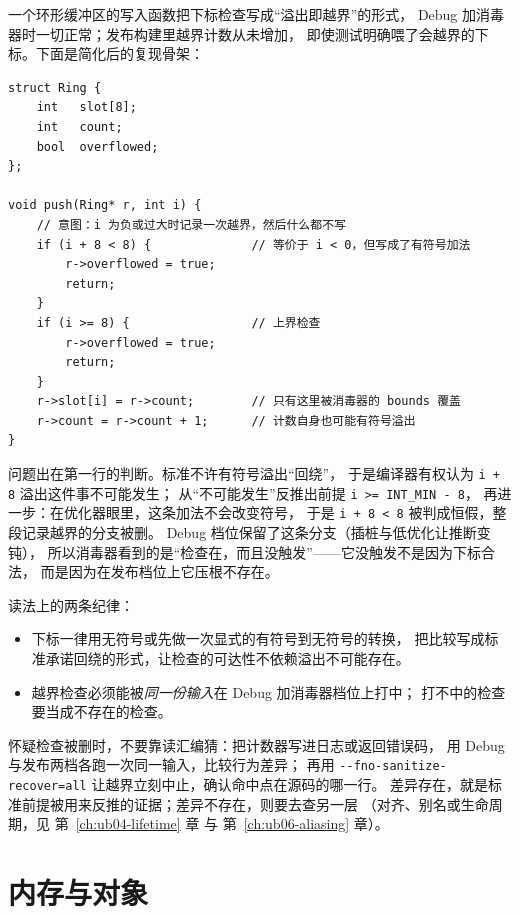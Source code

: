 \documentclass[12pt,a4paper,fontset=fandol]{ctexbook}
\newcommand{\Tp}[1]{\texttt{#1}}
\newcommand{\Opt}[1]{\texttt{-\/-#1}}
\begin{document}
\begin{casebox}[title={检查写在那儿，却一次也没触发}]
一个环形缓冲区的写入函数把下标检查写成“溢出即越界”的形式，
Debug 加消毒器时一切正常；发布构建里越界计数从未增加，
即使测试明确喂了会越界的下标。下面是简化后的复现骨架：
\end{casebox}

\begin{lstlisting}[style=cppstyle, caption={被当成不可能发生而删掉的前提}]
struct Ring {
    int   slot[8];
    int   count;
    bool  overflowed;
};

void push(Ring* r, int i) {
    // 意图：i 为负或过大时记录一次越界，然后什么都不写
    if (i + 8 < 8) {              // 等价于 i < 0，但写成了有符号加法
        r->overflowed = true;
        return;
    }
    if (i >= 8) {                 // 上界检查
        r->overflowed = true;
        return;
    }
    r->slot[i] = r->count;        // 只有这里被消毒器的 bounds 覆盖
    r->count = r->count + 1;      // 计数自身也可能有符号溢出
}
\end{lstlisting}

问题出在第一行的判断。标准不许有符号溢出“回绕”，
于是编译器有权认为 \Tp{i + 8} 溢出这件事不可能发生；
从“不可能发生”反推出前提 \Tp{i >= INT\_MIN - 8}，
再进一步：在优化器眼里，这条加法不会改变符号，
于是 \Tp{i + 8 < 8} 被判成恒假，整段记录越界的分支被删。
Debug 档位保留了这条分支（插桩与低优化让推断变钝），
所以消毒器看到的是“检查在，而且没触发”——它没触发不是因为下标合法，
而是因为在发布档位上它压根不存在。

读法上的两条纪律：

\begin{itemize}
\item 下标一律用无符号或先做一次显式的有符号到无符号的转换，
      把比较写成标准承诺回绕的形式，让检查的可达性不依赖溢出不可能存在。
\item 越界检查必须能被\emph{同一份输入}在 Debug 加消毒器档位上打中；
      打不中的检查要当成不存在的检查。
\end{itemize}

怀疑检查被删时，不要靠读汇编猜：把计数器写进日志或返回错误码，
用 Debug 与发布两档各跑一次同一输入，比较行为差异；
再用 \Opt{fno-sanitize-recover=all} 让越界立刻中止，确认命中点在源码的哪一行。
差异存在，就是标准前提被用来反推的证据；差异不存在，则要去查另一层
（对齐、别名或生命周期，见 第~\ref{ch:ub04-lifetime} 章 与 第~\ref{ch:ub06-aliasing} 章）。

\clearpage

\part{内存与对象}
\end{document}
